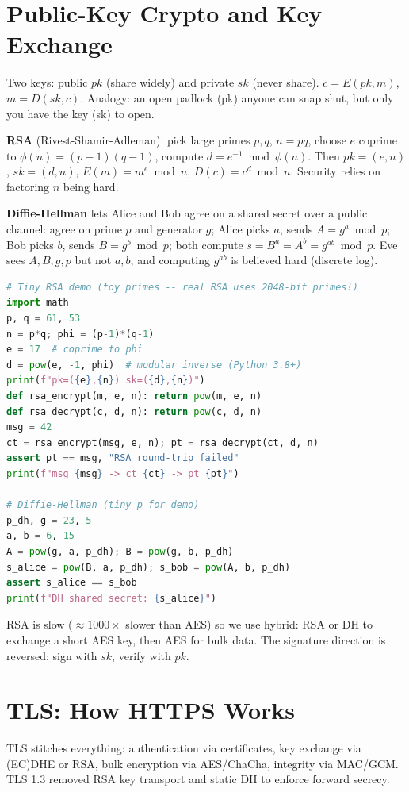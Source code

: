 \section{Public-Key Crypto and Key Exchange}\label{sec:pubkey}
Two keys: public $pk$ (share widely) and private $sk$ (never share). $c=E(pk,m)$, $m=D(sk,c)$. Analogy: an open padlock (pk) anyone can snap shut, but only you have the key (sk) to open.

\textbf{RSA} (Rivest-Shamir-Adleman): pick large primes $p,q$, $n=pq$, choose $e$ coprime to $\phi(n)=(p-1)(q-1)$, compute $d=e^{-1}\bmod\phi(n)$. Then $pk=(e,n)$, $sk=(d,n)$, $E(m)=m^e\bmod n$, $D(c)=c^d\bmod n$. Security relies on factoring $n$ being hard.

\textbf{Diffie-Hellman} lets Alice and Bob agree on a shared secret over a public channel: agree on prime $p$ and generator $g$; Alice picks $a$, sends $A=g^a\bmod p$; Bob picks $b$, sends $B=g^b\bmod p$; both compute $s=B^a=A^b=g^{ab}\bmod p$. Eve sees $A,B,g,p$ but not $a,b$, and computing $g^{ab}$ is believed hard (discrete log).

\begin{lstlisting}[language=Python]
# Tiny RSA demo (toy primes -- real RSA uses 2048-bit primes!)
import math
p, q = 61, 53
n = p*q; phi = (p-1)*(q-1)
e = 17  # coprime to phi
d = pow(e, -1, phi)  # modular inverse (Python 3.8+)
print(f"pk=({e},{n}) sk=({d},{n})")
def rsa_encrypt(m, e, n): return pow(m, e, n)
def rsa_decrypt(c, d, n): return pow(c, d, n)
msg = 42
ct = rsa_encrypt(msg, e, n); pt = rsa_decrypt(ct, d, n)
assert pt == msg, "RSA round-trip failed"
print(f"msg {msg} -> ct {ct} -> pt {pt}")

# Diffie-Hellman (tiny p for demo)
p_dh, g = 23, 5
a, b = 6, 15
A = pow(g, a, p_dh); B = pow(g, b, p_dh)
s_alice = pow(B, a, p_dh); s_bob = pow(A, b, p_dh)
assert s_alice == s_bob
print(f"DH shared secret: {s_alice}")
\end{lstlisting}

RSA is slow ($\approx 1000\times$ slower than AES) so we use hybrid: RSA or DH to exchange a short AES key, then AES for bulk data. The signature direction is reversed: sign with $sk$, verify with $pk$.

\section{TLS: How HTTPS Works}\label{sec:tls}
TLS stitches everything: authentication via certificates, key exchange via (EC)DHE or RSA, bulk encryption via AES/ChaCha, integrity via MAC/GCM. TLS 1.3 removed RSA key transport and static DH to enforce forward secrecy.

